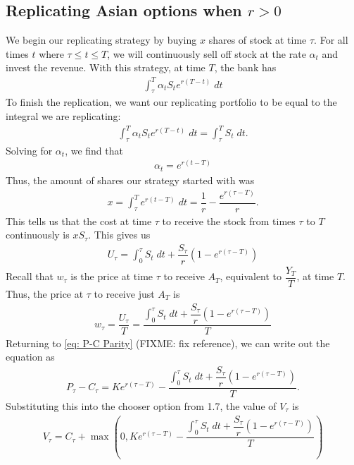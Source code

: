 \documentclass[reqno]{amsart}
\begin{document}
\subsection{Replicating Asian options when $r > 0$}
We begin our replicating strategy by buying $x$ shares of stock at time $\tau$. For all times $t$ where $\tau \leq t \leq T$, we will continuously sell off stock at the rate $\alpha_t$ and invest the revenue.
With this strategy, at time $T$, the bank has 
\begin{align}
     \int_\tau^T \alpha_t S_t e^{r(T-t)} \; dt
\end{align}
To finish the replication, we want our replicating portfolio to be equal to the integral we are replicating:
\begin{align}
     \int_\tau^T \alpha_t S_t e^{r(T-t)} \; dt = \int_\tau^T S_t \; dt.
\end{align}
Solving for $\alpha_t$, we find that
\begin{align}
     \alpha_t = e^{r(t-T)}
\end{align}
Thus, the amount of shares our strategy started with was
\begin{align}
     x = \int_\tau^T e^{r(t-T)} \; dt = \dfrac{1}{r} - \dfrac{e^{r(\tau - T)}}{r}.
\end{align}
This tells us that the cost at time $\tau$ to receive the stock from times $\tau$ to $T$ continuously is $x S_\tau$. This gives us 
\begin{align}
     U_\tau = \int_0^\tau S_t \; dt + \dfrac{S_\tau}{r}\left( 1 - e^{r(\tau - T)} \right)
\end{align}
Recall that $w_\tau$ is the price at time $\tau$ to receive $A_T$, equivalent to $\dfrac{Y_T}{T}$, at time $T$.
Thus, the price at $\tau$ to receive just $A_T$ is 
\begin{align}
     w_\tau = \dfrac{U_\tau}{T} = \dfrac{\int_0^\tau S_t \; dt + \dfrac{S_\tau}{r}\left( 1 - e^{r(\tau - T)} \right)}{T}
\end{align}
Returning to \eqref{eq: P-C Parity} (FIXME: fix reference), we can write out the equation as
\begin{align}
     P_\tau - C_\tau = Ke^{r(\tau - T)} - \dfrac{\int_0^\tau S_t \; dt + \dfrac{S_\tau}{r}\left( 1 - e^{r(\tau - T)} \right)}{T}.
\end{align}
Substituting this into the chooser option from 1.7, the value of $V_\tau$ is
\begin{align}
     V_\tau = C_\tau + \max(0, Ke^{r(\tau - T)} - \dfrac{\int_0^\tau S_t \; dt + \dfrac{S_\tau}{r}\left( 1 - e^{r(\tau - T)} \right)}{T})
\end{align}
\end{document}
